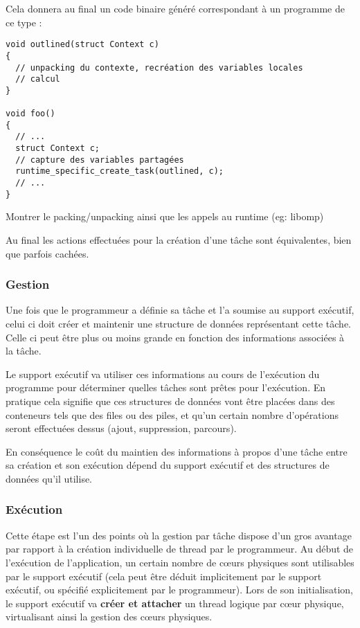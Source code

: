 Cela donnera au final un code binaire généré correspondant à un programme de ce type :

\begin{lstlisting}
void outlined(struct Context c)
{
  // unpacking du contexte, recréation des variables locales
  // calcul
}

void foo()
{
  // ...
  struct Context c;
  // capture des variables partagées
  runtime_specific_create_task(outlined, c);
  // ...
}
\end{lstlisting}

\begin{todo}
  Montrer le packing/unpacking ainsi que les appels au runtime (eg: libomp)
\end{todo}

Au final les actions effectuées pour la création d'une tâche sont équivalentes, bien que parfois cachées.


\subsubsection{Gestion}

Une fois que le programmeur a définie sa tâche et l'a soumise au support exécutif, celui ci doit créer et maintenir une structure de données représentant cette tâche.
Celle ci peut être plus ou moins grande en fonction des informations associées à la tâche.

Le support exécutif va utiliser ces informations au cours de l'exécution du programme pour déterminer quelles tâches sont prêtes pour l'exécution.
En pratique cela signifie que ces structures de données vont être placées dans des conteneurs tels que des files ou des piles, et qu'un certain nombre d'opérations seront effectuées dessus (ajout, suppression, parcours).

En conséquence le coût du maintien des informations à propos d'une tâche entre sa création et son exécution dépend du support exécutif et des structures de données qu'il utilise.


\subsubsection{Exécution}

Cette étape est l'un des points où la gestion par tâche dispose d'un gros avantage par rapport à la création individuelle de thread par le programmeur.
Au début de l'exécution de l'application, un certain nombre de cœurs physiques sont utilisables par le support exécutif (cela peut être déduit implicitement par le support exécutif, ou spécifié explicitement par le programmeur).
Lors de son initialisation, le support exécutif va \textbf{créer et attacher} un thread logique par cœur physique, virtualisant ainsi la gestion des cœurs physiques.

